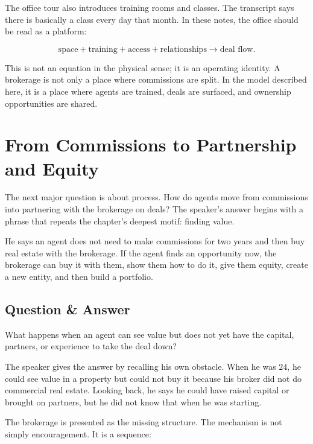 The office tour also introduces training rooms and classes. The transcript says there is basically a class every day that month. In these notes, the office should be read as a platform:

\begin{equation}
\text{space} + \text{training} + \text{access} + \text{relationships}
\longrightarrow
\text{deal flow}.
\end{equation}

This is not an equation in the physical sense; it is an operating identity. A brokerage is not only a place where commissions are split. In the model described here, it is a place where agents are trained, deals are surfaced, and ownership opportunities are shared.

\section{From Commissions to Partnership and Equity}

The next major question is about process. How do agents move from commissions into partnering with the brokerage on deals? The speaker's answer begins with a phrase that repeats the chapter's deepest motif: finding value.

He says an agent does not need to make commissions for two years and then buy real estate with the brokerage. If the agent finds an opportunity now, the brokerage can buy it with them, show them how to do it, give them equity, create a new entity, and then build a portfolio.

\subsection{Question \& Answer}

What happens when an agent can see value but does not yet have the capital, partners, or experience to take the deal down?

The speaker gives the answer by recalling his own obstacle. When he was \(24\), he could see value in a property but could not buy it because his broker did not do commercial real estate. Looking back, he says he could have raised capital or brought on partners, but he did not know that when he was starting.

The brokerage is presented as the missing structure. The mechanism is not simply encouragement. It is a sequence:

